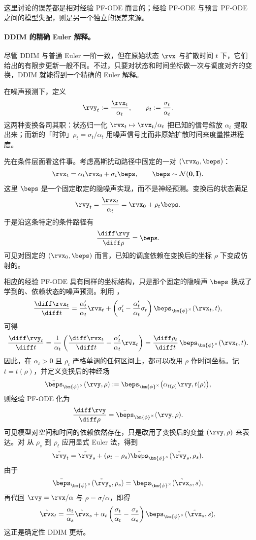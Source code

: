 这里讨论的误差都是相对经验 PF-ODE 而言的；经验 PF-ODE 与预言 PF-ODE 之间的模型失配，则是另一个独立的误差来源。


\paragraph{DDIM 的精确 Euler 解释。}
尽管 DDIM 与普通 Euler 一阶一致，但在原始状态 $\rvx$ 与扩散时间 $t$ 下，它们给出的有限步更新一般不同。不过，只要对状态和时间坐标做一次与调度对齐的变换，DDIM 就能得到一个精确的 Euler 解释。

在噪声预测下，定义
\begin{equation*}
\rvy_t
:=
\frac{\rvx_t}{\alpha_t},
\qquad
\rho_t
:=
\frac{\sigma_t}{\alpha_t}.
\end{equation*}
这两种变换各司其职：状态归一化 $\rvx_t\mapsto\rvx_t/\alpha_t$ 把已知的信号缩放 $\alpha_t$ 提取出来；而新的「时钟」$\rho_t=\sigma_t/\alpha_t$ 用噪声信号比而非原始扩散时间来度量推进程度。

先在条件层面看这件事。考虑高斯扰动路径中固定的一对 $(\rvx_0,\beps)$：
\[
\rvx_t
=
\alpha_t\rvx_0+\sigma_t\beps,
\qquad
\beps\sim\mathcal N(\mathbf 0,\mathbf I).
\]
这里 $\beps$ 是一个固定取定的隐噪声实现，而不是神经预测。变换后的状态满足
\[
\rvy_t
=
\frac{\rvx_t}{\alpha_t}
=
\rvx_0+\rho_t\beps.
\]
于是沿这条特定的条件路径有
\[
\frac{\diff\rvy}{\diff\rho}
=
\beps.
\]
可见对固定的 $(\rvx_0,\beps)$ 而言，已知的调度依赖在变换后的坐标 $\rho$ 下变成仿射的。

相应的经验 PF-ODE 具有同样的坐标结构，只是那个固定的隐噪声 $\beps$ 换成了学到的、依赖状态的噪声预测。利用 ，
\[
\frac{\diff\rvx_t}{\diff t}
=
\frac{\alpha_t'}{\alpha_t}\rvx_t
+
\left(
\sigma_t'
-
\frac{\alpha_t'}{\alpha_t}\sigma_t
\right)
\beps_{\bm{\phi}^\times}(\rvx_t,t),
\]
可得
\begin{align}
\frac{\diff\rvy_t}{\diff t}
=
\frac{1}{\alpha_t}
\left(
\frac{\diff\rvx_t}{\diff t}
-
\frac{\alpha_t'}{\alpha_t}\rvx_t
\right)=
\frac{\diff\rho_t}{\diff t}\,
\beps_{\bm{\phi}^\times}(\rvx_t,t).
\label{eq:ddim-coordinate-ode-t}
\end{align}
因此，在 $\alpha_t>0$ 且 $\rho_t$ 严格单调的任何区间上，都可以改用 $\rho$ 作时间坐标。记 $t=t(\rho)$，并定义变换后的神经场
\[
\bar{\beps}_{\bm{\phi}^\times}(\rvy,\rho)
:=
\beps_{\bm{\phi}^\times}
\bigl(
\alpha_{t(\rho)}\rvy,
t(\rho)
\bigr),
\]
则经验 PF-ODE 化为
\begin{equation}
\label{eq:ddim-coordinate-ode-rho}
\frac{\diff\rvy}{\diff\rho}
=
\bar{\beps}_{\bm{\phi}^\times}(\rvy,\rho).
\end{equation}
可见模型对空间和时间的依赖依然存在，只是改用了变换后的变量 $(\rvy,\rho)$ 来表达。对  从 $\rho_s$ 到 $\rho_t$ 应用显式 Euler 法，得到
\[
\tilde\rvy_t
=
\tilde\rvy_s
+
(\rho_t-\rho_s)
\bar{\beps}_{\bm{\phi}^\times}(\tilde\rvy_s,\rho_s).
\]
由于
\[
\bar{\beps}_{\bm{\phi}^\times}(\tilde\rvy_s,\rho_s)
=
\beps_{\bm{\phi}^\times}(\tilde\rvx_s,s),
\]
再代回 $\rvy=\rvx/\alpha$ 与 $\rho=\sigma/\alpha$，即得
\[
\tilde\rvx_t
=
\frac{\alpha_t}{\alpha_s}\tilde\rvx_s
+
\alpha_t
\left(
\frac{\sigma_t}{\alpha_t}
-
\frac{\sigma_s}{\alpha_s}
\right)
\beps_{\bm{\phi}^\times}(\tilde\rvx_s,s),
\]
这正是确定性 DDIM 更新。

